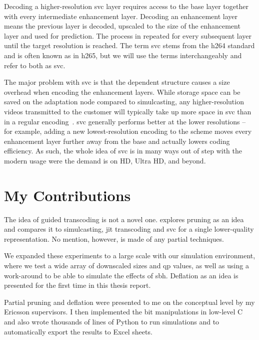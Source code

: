 Decoding a higher-resolution \gls{svc} layer requires access to the base layer together with every intermediate enhancement layer. Decoding an enhancement layer means the previous layer is decoded, upscaled to the size of the enhancement layer and used for prediction. The process in repeated for every subsequent layer until the target resolution is reached. The term \gls{svc} stems from the \gls{h264} standard and is often known as  in \gls{h265}, but we will use the terms interchangeably and refer to both as \gls{svc}.


The major problem with \gls{svc} is that the dependent structure causes a size overhead when encoding the enhancement layers. While storage space can be saved on the adaptation node compared to simulcasting, any higher-resolution videos transmitted to the customer will typically take up more space in \gls{svc} than in a regular encoding~\cite{Van_Wallendael}. \Gls{svc} generally performs better at the lower resolutions -- for example, adding a new lowest-resolution encoding to the scheme moves every enhancement layer further away from the base and actually lowers coding efficiency. As such, the whole idea of \gls{svc} is in many ways out of step with the modern usage were the demand is on HD, Ultra HD, and beyond.


\section{My Contributions}
The idea of guided transcoding is not a novel one. \cite{Van_Wallendael} explores pruning as an idea and compares it to simulcasting, \gls{jit} transcoding and \gls{svc} for a single lower-quality representation. No mention, however, is made of any partial techniques.

We expanded these experiments to a large scale with our simulation environment, where we test a wide array of downscaled sizes and \gls{qp} values, as well as using a work-around to be able to simulate the effects of \gls{sbh}. Deflation as an idea is presented for the first time in this thesis report.

Partial pruning and deflation were presented to me on the conceptual level by my Ericsson supervisors. I then implemented the bit manipulations in low-level C and also wrote thousands of lines of Python to run simulations and to automatically export the results to Excel sheets.